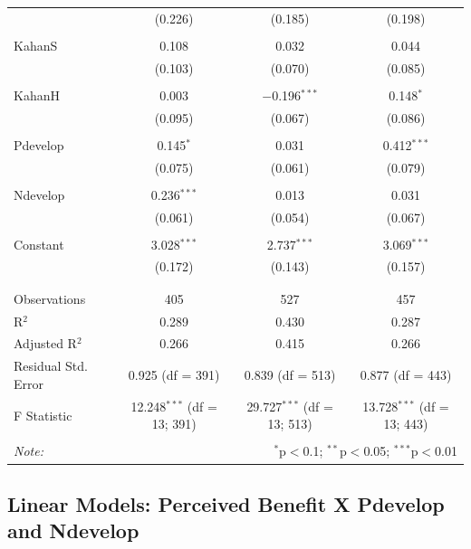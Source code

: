 \documentclass[
]{article}
\begin{document}
\begin{table}[!htbp]
\begin{tabular}{@{\extracolsep{5pt}}lccc}
  & (0.226) & (0.185) & (0.198) \\ 
  & & & \\ 
 KahanS & 0.108 & 0.032 & 0.044 \\ 
  & (0.103) & (0.070) & (0.085) \\ 
  & & & \\ 
 KahanH & 0.003 & $-$0.196$^{***}$ & 0.148$^{*}$ \\ 
  & (0.095) & (0.067) & (0.086) \\ 
  & & & \\ 
 Pdevelop & 0.145$^{*}$ & 0.031 & 0.412$^{***}$ \\ 
  & (0.075) & (0.061) & (0.079) \\ 
  & & & \\ 
 Ndevelop & 0.236$^{***}$ & 0.013 & 0.031 \\ 
  & (0.061) & (0.054) & (0.067) \\ 
  & & & \\ 
 Constant & 3.028$^{***}$ & 2.737$^{***}$ & 3.069$^{***}$ \\ 
  & (0.172) & (0.143) & (0.157) \\ 
  & & & \\ 
\hline \\[-1.8ex] 
Observations & 405 & 527 & 457 \\ 
R$^{2}$ & 0.289 & 0.430 & 0.287 \\ 
Adjusted R$^{2}$ & 0.266 & 0.415 & 0.266 \\ 
Residual Std. Error & 0.925 (df = 391) & 0.839 (df = 513) & 0.877 (df = 443) \\ 
F Statistic & 12.248$^{***}$ (df = 13; 391) & 29.727$^{***}$ (df = 13; 513) & 13.728$^{***}$ (df = 13; 443) \\ 
\hline 
\hline \\[-1.8ex] 
\textit{Note:}  & \multicolumn{3}{r}{$^{*}$p$<$0.1; $^{**}$p$<$0.05; $^{***}$p$<$0.01} \\ 
\end{tabular} 
\end{table} 
\endgroup

\newpage

\hypertarget{linear-models-perceived-benefit-x-pdevelop-and-ndevelop}{%
\subsection{Linear Models: Perceived Benefit X Pdevelop and
Ndevelop}\label{linear-models-perceived-benefit-x-pdevelop-and-ndevelop}}

\begingroup\setlength{\tabcolsep}{1pt}
\end{document}
